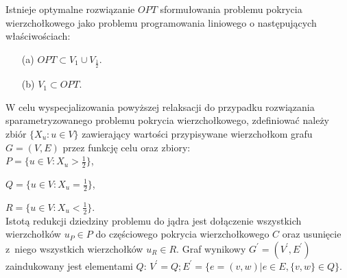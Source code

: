 \begin{theorem}
  Istnieje optymalne rozwiązanie $OPT$ sformułowania problemu pokrycia wierzchołkowego jako problemu programowania liniowego o następujących właściwościach:
  \begin{itemize}
    \item[(a)] $OPT \subset V_1 \cup V_{\frac{1}{2}}$.
    \item[(b)] $V_1 \subset OPT$.
  \end{itemize}
\end{theorem}

W celu wyspecjalizowania powyższej relaksacji do przypadku rozwiązania
sparametryzowanego problemu pokrycia wierzchołkowego, zdefiniować należy zbiór 
$\{ X_u : u \in V \}$ zawierający wartości przypisywane wierzchołkom grafu 
$G=(V,E)$ przez funkcję celu oraz zbiory:\\


$P=\{u \in V : X_u>\frac{1}{2}\}$,\par
$Q=\{u \in V : X_u=\frac{1}{2}\}$,\par
$R=\{u \in V : X_u<\frac{1}{2}\}$.\\


Istotą redukcji dziedziny problemu do jądra jest dołączenie wszystkich
wierzchołków $u_P \in P$ do częściowego pokrycia wierzchołkowego $C$ oraz 
usunięcie z~niego wszystkich wierzchołków $u_R \in R$.
Graf wynikowy $G^\prime=(V^\prime, E^\prime)$ zaindukowany jest elementami $Q$: 
$V^\prime=Q; E^\prime=\{e=(v, w)| e \in E, \{v, w\} \in Q\}$.

